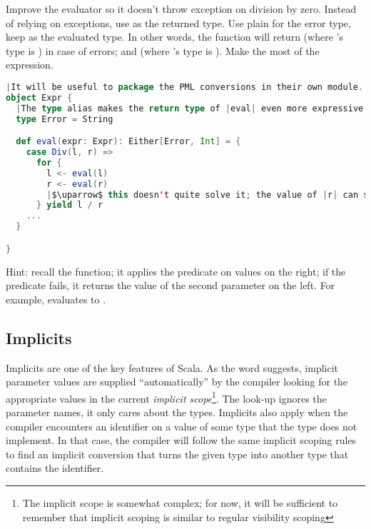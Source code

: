 \documentclass[10 pt]{article}
\begin{document}
\begin{example}
Improve the evaluator so it doesn't throw exception on division by zero. Instead of relying on exceptions, use  as the returned type. Use plain  for the error type, keep  as the evaluated type. In other words, the  function will return  (where 's type is ) in case of errors; and  (where 's type is ). Make the most of the  expression.

\begin{lstlisting}[caption={Expression evaluator}, label={code:eepm}, language=Scala, escapechar=|]
|It will be useful to package the PML conversions in their own module.|
object Expr {
  |The type alias makes the return type of |eval| even more expressive.|
  type Error = String

  def eval(expr: Expr): Either[Error, Int] = {
    case Div(l, r) =>
      for {
        l <- eval(l)
        r <- eval(r) 
        |$\uparrow$ this doesn't quite solve it; the value of |r| can still be |Right(0)|.| 
      } yield l / r
    ...
  }

}
\end{lstlisting}

Hint: recall the  function; it applies the predicate on values on the right; if the predicate fails, it returns the value of the second parameter on the left. For example,  evaluates to .

\end{example}

\subsection{Implicits} 
Implicits are one of the key features of Scala. As the word suggests, implicit parameter values are supplied ``automatically'' by the compiler looking for the appropriate values in the current \emph{implicit scope}\footnote{The implicit scope is somewhat complex; for now, it will be sufficient to remember that implicit scoping is similar to regular visibility scoping}. The look-up ignores the parameter names, it only cares about the types. Implicits also apply when the compiler encounters an identifier on a value of some type that the type does not implement. In that case, the compiler will follow the same implicit scoping rules to find an implicit conversion that turns the given type into another type that contains the identifier. 
\end{document}
